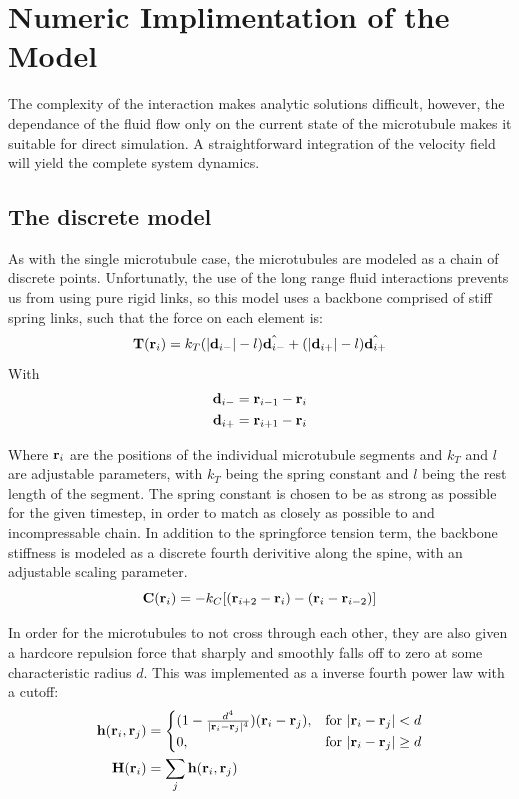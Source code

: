 \documentclass[11pt]{ucthesis}
\def\br{{\bf r}}
\begin{document}
{\section{Numeric Implimentation of the Model}
The complexity of the interaction makes analytic solutions difficult, however, the dependance of the fluid flow only on the current state of the microtubule makes it suitable for direct simulation. A straightforward integration of the velocity field will yield the complete system dynamics.
\subsection{The discrete model}
As with the single microtubule case, the microtubules are modeled as a chain of discrete points. Unfortunatly, the use of the long range fluid interactions prevents us from using pure rigid links, so this model uses a backbone comprised of stiff spring links, such that the force on each element is:
\begin{equation}
\label{eq:discretespring}
\mathbf{T}(\br_i) = k_T ( |\mathbf{d}_{i-}| - l )\hat{\mathbf{d}_{i-}} + ( |\mathbf{d}_{i+}| - l )\hat{\mathbf{d}_{i+}}
\end{equation}
With 
\begin{eqnarray*}
\mathbf{d}_{i-} &= \br_{i-1} - \br_i \\
\mathbf{d}_{i+} &= \br_{i+1} - \br_i
\end{eqnarray*}

Where $\br_i$ are the positions of the individual microtubule segments and $k_T$ and $l$  are adjustable parameters, with $k_T$ being the spring constant and $l$ being the rest length of the segment.  The spring constant is chosen to be as strong as possible for the given timestep, in order to match as closely as possible to and incompressable chain.
In addition to the springforce tension term, the backbone stiffness is modeled as a discrete fourth derivitive along the spine, with an adjustable scaling parameter.
\begin{equation}
\label{eq:discretestiff}
\mathbf{C}(\br_i) =  - k_C[ (\br_{i+2} - \br_i) - (\br_i - \br_{i-2})]
\end{equation}

In order for the microtubules to not cross through each other, they are also given a hardcore repulsion force that sharply and smoothly falls off to zero at some characteristic radius $d$.
This was implemented as a inverse fourth power law with a cutoff:
\begin{align}
\label{eq:discretehardcore}
\mathbf{h}(\br_i,\br_j) &= \begin{cases}(1 - \frac{d^4}{|\br_i - \br_j|^4})(\br_i - \br_j),&  \text{for } |\br_i - \br_j| < d \\
0,& \text{for } |\br_i - \br_j| \ge d \end{cases}\\
\mathbf{H}(\br_i) &= \sum_j \mathbf{h}(\br_i,\br_j)
\end{align}

}
\end{document}
